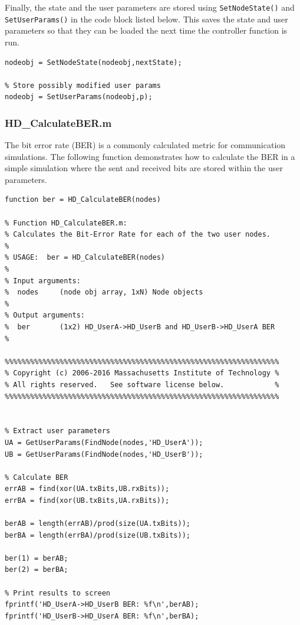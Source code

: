 Finally, the state and the user parameters are stored using
\verb+SetNodeState()+ and \verb+SetUserParams()+ in the code block
listed below.  This saves the state and user parameters so that they
can be loaded the next time the controller function is run.

\begin{lstlisting}[name=hdState]
% Set next state
nodeobj = SetNodeState(nodeobj,nextState);

% Store possibly modified user params
nodeobj = SetUserParams(nodeobj,p);
\end{lstlisting}


\subsubsection{HD\_CalculateBER.m}

The bit error rate (BER) is a commonly calculated metric for
communication simulations.  The following function demonstrates how
to calculate the BER in a simple simulation where the sent and
received bits are stored within the user parameters.

\begin{lstlisting}[name=ber]
function ber = HD_CalculateBER(nodes)

% Function HD_CalculateBER.m:
% Calculates the Bit-Error Rate for each of the two user nodes.
%
% USAGE:  ber = HD_CalculateBER(nodes)
%
% Input arguments:
%  nodes     (node obj array, 1xN) Node objects
%
% Output arguments:
%  ber       (1x2) HD_UserA->HD_UserB and HD_UserB->HD_UserA BER
%

%%%%%%%%%%%%%%%%%%%%%%%%%%%%%%%%%%%%%%%%%%%%%%%%%%%%%%%%%%%%%%%%%
% Copyright (c) 2006-2016 Massachusetts Institute of Technology %
% All rights reserved.   See software license below.            %
%%%%%%%%%%%%%%%%%%%%%%%%%%%%%%%%%%%%%%%%%%%%%%%%%%%%%%%%%%%%%%%%%


% Extract user parameters
UA = GetUserParams(FindNode(nodes,'HD_UserA'));
UB = GetUserParams(FindNode(nodes,'HD_UserB'));

% Calculate BER
errAB = find(xor(UA.txBits,UB.rxBits));
errBA = find(xor(UB.txBits,UA.rxBits));

berAB = length(errAB)/prod(size(UA.txBits));
berBA = length(errBA)/prod(size(UB.txBits));

ber(1) = berAB;
ber(2) = berBA;

% Print results to screen
fprintf('HD_UserA->HD_UserB BER: %f\n',berAB);
fprintf('HD_UserB->HD_UserA BER: %f\n',berBA);
\end{lstlisting}

